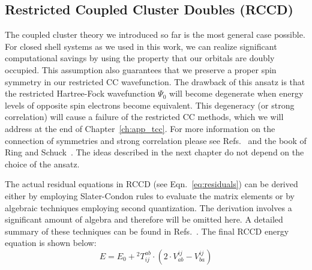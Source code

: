 \subsection{Restricted Coupled Cluster Doubles (RCCD)
\label{sec:preliminaries_rccd}}
The coupled cluster theory we introduced so far is the most general case 
possible. For closed shell systems as we used in this work, we can 
realize significant computational savings by using the property that our 
orbitals are doubly occupied. This assumption also guarantees that we preserve 
a proper spin symmetry in our restricted CC wavefunction. The drawback of this 
ansatz is that the restricted Hartree-Fock wavefunction $\Psi_{0}$ 
will become degenerate when energy levels of opposite spin 
electrons become equivalent. This degeneracy (or strong correlation)
will cause a failure of the restricted CC methods, which we will address at the 
end of Chapter~\ref{ch:app_tcc}. For more information on the 
connection of symmetries and strong correlation please see 
Refs.~\cite{jimenez2012projected, scuseria2011projected} and the book of Ring 
and Schuck~\cite{ring2004nuclear}. The ideas described in 
the next chapter do not depend on the choice of the ansatz.

The actual residual equations in RCCD (see Eqn.~\ref{eq:residuals}) can be 
derived either by employing Slater-Condon rules to evaluate the matrix elements 
or by algebraic techniques employing second quantization. The derivation 
involves a significant amount of algebra and therefore will be 
omitted here. A detailed summary of these techniques can be found in 
Refs.~\cite{crawford2000introduction, shavitt2009many}. The final RCCD energy 
equation is shown below:
%
\begin{equation}
 E = E_{0} + {}^{2} T^{ab}_{ij} \cdot (2 \cdot V^{ij}_{ab} - V^{ij}_{ba})
\label{eq:ccd_energy_equation}
\end{equation}
%

